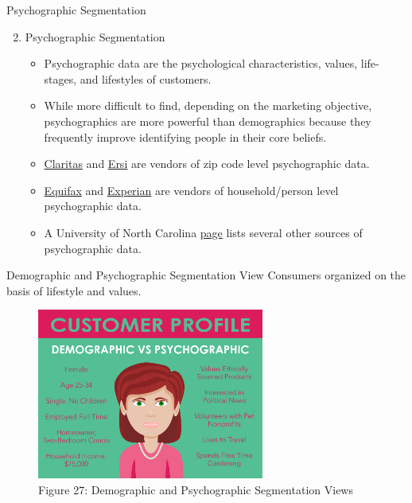 \documentclass[pdf]{beamer}
\theoremstyle{remark}
\theoremstyle{definition}
\begin{document}
\begin{frame}[t]{Psychographic Segmentation}
\begin{enumerate}
 \setcounter{enumi}{1}
 \item Psychographic Segmentation
 \begin{itemize}
  \item Psychographic data are the psychological characteristics, values, life-stages, and lifestyles of customers.
  \item While more difficult to find, depending on the marketing objective, psychographics are more powerful than demographics because they frequently improve identifying people in their core beliefs. 
  \item \href{https://claritas.com/prizm-premier/}{Claritas} and \href{https://www.esri.com/en-us/home}{Ersi} are vendors of zip code level psychographic data.
  \item \href{https://www.equifax.com/business/product/economic-cohorts/}{Equifax} and \href{https://www.experian.com/marketing-services/mosaic}{Experian} are vendors of household/person level psychographic data.\
  \item  A University of North Carolina \href{https://guides.lib.unc.edu/market-research-tutorial/psychographics}{page} lists several other sources of psychographic data. 
\end{itemize}
\end{enumerate}
\end{frame}

\begin{frame}[t]{Demographic and Psychographic Segmentation View}
Consumers organized on the basis of lifestyle and values. \\
\vspace{1.5ex}
\begin{figure}[htbp]
  \captionsetup{justification=centering}
  \includegraphics[height=5.6cm, trim=0.0cm 0.0cm 0.0cm 0.0cm width=5.6cm]{Images/Psychographic.png}
  \caption{Figure {\color{franklinblue} 27}: Demographic and Psychographic Segmentation Views}
\end{figure}
\end{frame}
\end{document}
